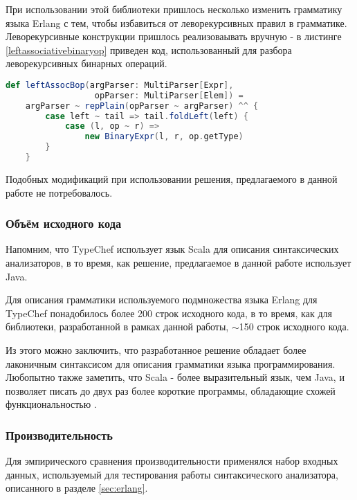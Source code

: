 При использовании этой библиотеки пришлось несколько изменить грамматику языка Erlang с тем, чтобы избавиться от леворекурсивных правил в грамматике. Леворекурсивные конструкции пришлось реализоваывать вручную - в листинге \ref{leftassociativebinaryop} приведен код, использованный для разбора леворекурсивных бинарных операций. 

\begin{minipage}{\linewidth}
\begin{lstlisting}[caption={Реализация леворекурсивных конструкций в TypeChef},label=leftassociativebinaryop,language=Scala]
def leftAssocBop(argParser: MultiParser[Expr], 
                  opParser: MultiParser[Elem]) =
	argParser ~ repPlain(opParser ~ argParser) ^^ {
		case left ~ tail => tail.foldLeft(left) {
			case (l, op ~ r) => 
				new BinaryExpr(l, r, op.getType)
		}
	}
\end{lstlisting}
\end{minipage}

Подобных модификаций при использовании решения, предлагаемого в данной работе не потребовалось.

\subsubsection{Объём исходного кода}

Напомним, что TypeChef использует язык Scala для описания синтаксических анализаторов, в то время, как решение, предлагаемое в данной работе использует Java.

Для описания грамматики используемого подмножества языка Erlang для TypeChef понадобилось более 200 строк исходного кода, в то время, как для библиотеки, разработанной в рамках данной работы, $\sim$150 строк исходного кода.

Из этого можно заключить, что разработанное решение обладает более лаконичным синтаксисом для описания грамматики языка программирования. Любопытно также заметить, что Scala - более выразительный язык, чем Java, и позволяет писать до двух раз более короткие программы, обладающие схожей функциональностью \cite{scalavsjava}.


\subsubsection{Производительность}

Для эмпирического сравнения производительности применялся набор входных данных, используемый для тестирования работы синтаксического анализатора, описанного в разделе \ref{sec:erlang}.

